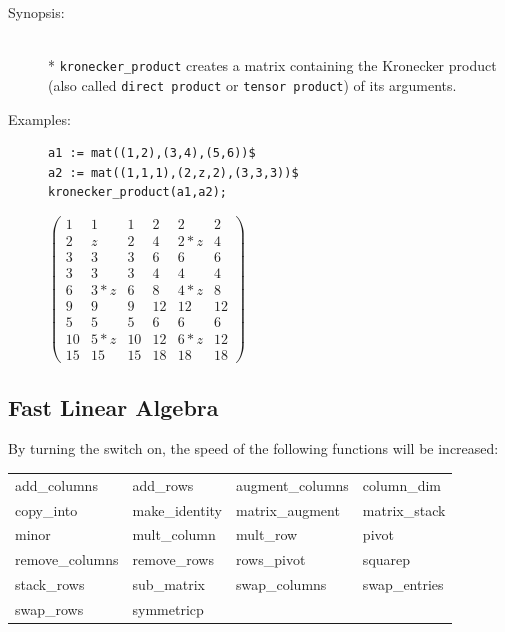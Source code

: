 {\begin{description}
\item[Synopsis:]\mbox{}\\*
\texttt{kronecker\_product} creates a matrix containing the Kronecker product
(also called \texttt{direct product} or \texttt{tensor product}) of its arguments.

\item[Examples:]
\begin{verbatim}
a1 := mat((1,2),(3,4),(5,6))$
a2 := mat((1,1,1),(2,z,2),(3,3,3))$
kronecker_product(a1,a2);
\end{verbatim}
\begin{flushleft}
\(
\begin{pmatrix} 1 & 1 & 1 & 2 & 2 & 2 \\
2 &  z & 2 & 4  &2*z &4 \\
3 &  3 & 3 & 6  & 6  &6 \\
3 &  3 & 3 & 4  & 4  &4 \\
6 & 3*z& 6 & 8  &4*z &8 \\
9 &  9 & 9 & 12 &12  &12\\
5 &  5 & 5 & 6  & 6  &6 \\
10 &5*z& 10& 12 &6*z &12 \\
15 &15 & 15& 18 &18  &18
\end{pmatrix}
\)
\end{flushleft}
\end{description}

\iffalse

\subsection{Fast Linear Algebra}
\hypertarget{switch:FAST_LA}{}

By turning the  switch on, the speed of the following
functions will be increased:

\begin{tabular}{l l l l}
   add\_columns    & add\_rows      & augment\_columns & column\_dim  \\
   copy\_into      & make\_identity & matrix\_augment  & matrix\_stack\\
   minor           & mult\_column   &  mult\_row       & pivot        \\
   remove\_columns & remove\_rows   & rows\_pivot      & squarep      \\
   stack\_rows     & sub\_matrix    & swap\_columns    & swap\_entries\\
   swap\_rows      & symmetricp
\end{tabular}

}
